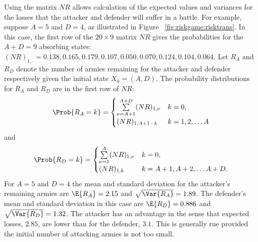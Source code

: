 \documentclass[12pt]{article}
\begin{document}
Using the matrix \( NR \) allows calculation of the expected values and
variances for the losses that the attacker and defender will suffer in a
battle.  For example, suppose \( A = 5 \) and \( D = 4 \), as
illustrated in Figure~%
\ref{fig:riskgame:risktrans}.  In this case, the first row of the \( 20
\times 9 \) matrix \( NR \) gives the probabilities for the \( A + D = 9
\) absorbing states:  \( (NR)_{1,\cdot} = 0.138, 0.165, 0.179, 0.107,
0.050, 0.070, 0.124, 0.104, 0.064 \).  Let \( R_A \) and \( R_D \)
denote the number of armies remaining for the attacker and defender
respectively given the initial state \( X_0 = (A, D) \).  The
probability distributions for \( R_A \) and \( R_D \) are in the first
row of \( NR \):
\[
    \Prob{R_A = k} =
    \begin{cases}
        \sum\limits_{\nu=A+1}^{A+D} (NR)_{1,\nu}        & k = 0, \\
        (NR)_{1,A+1-k}  & k = 1, 2, \dots A
    \end{cases}
\] and
\[
    \Prob{R_D = k} =
    \begin{cases}
        \sum\limits_{\nu=1}^{A} (NR)_{1,\nu}    & k=0, \\
        (NR)_{1,k}      & k = A+1, A+2, \dots A+D.
    \end{cases}
\] For \( A = 5 \) and \( D = 4 \) the mean and standard deviation for
the attacker's remaining armies are \( \E{R_A} = 2.15 \) and \( \sqrt{\Var
{R_A}} = 1.89 \).  The defender's mean and standard deviation in this
case are \( \E{R_D} = 0.886 \) and \( \sqrt{\Var{R_D}} = 1.32 \).  The
attacker has an advantage in the sense that expected losses, \( 2.85 \),
are lower than for the defender, \( 3.1 \).  This is generally rue
provided the initial number of attacking armies is not too small.
\end{document}
